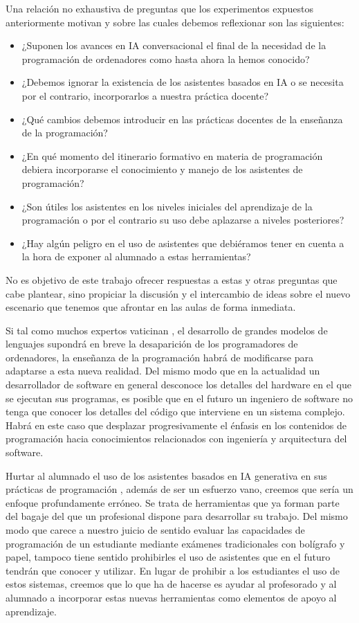 \documentclass[twocolumn,twoside,a4paper, 10pt]{article}
\begin{document}
Una relación no exhaustiva de preguntas que los experimentos expuestos anteriormente motivan y sobre las cuales 
debemos reflexionar son las siguientes:
\begin{itemize} 
\item ¿Suponen los avances en IA conversacional el final de la necesidad de la programación de ordenadores como hasta ahora
  la hemos conocido?
\item ¿Debemos ignorar la existencia de los asistentes basados en IA o se necesita por el contrario, incorporarlos a
    nuestra práctica docente?
\item ¿Qué cambios debemos introducir en las prácticas docentes de la enseñanza de la programación?
\item ¿En qué momento del itinerario formativo en materia de programación debiera incorporarse el conocimiento
  y manejo de los asistentes de programación?
\item ¿Son útiles los asistentes en los niveles iniciales del aprendizaje de la programación o por el
  contrario su uso debe aplazarse a niveles posteriores?
\item ¿Hay algún peligro en el uso de asistentes que debiéramos tener en cuenta a la hora de exponer al
  alumnado a estas herramientas?
\end {itemize} 

No es objetivo de este trabajo ofrecer respuestas a estas y otras preguntas que cabe plantear, sino propiciar
la discusión y el intercambio de ideas sobre el nuevo escenario que tenemos que afrontar en las aulas de forma
inmediata.

Si tal como muchos expertos vaticinan 
\cite{Welsh:2023:TEoP}, 
el desarrollo de grandes modelos de lenguajes supondrá en breve la desaparición de los programadores de
ordenadores, la enseñanza de la programación habrá de modificarse para adaptarse a esta nueva realidad. 
Del mismo modo que en la actualidad un desarrollador de software en general desconoce los detalles del
hardware en el que se ejecutan sus programas, es posible que en el futuro un ingeniero de software no
tenga que conocer los detalles del código que interviene en un sistema complejo.
Habrá en este caso que desplazar progresivamente el énfasis en los contenidos de programación hacia 
conocimientos relacionados con ingeniería y arquitectura del software.

Hurtar al alumnado el uso de los asistentes basados en IA generativa en sus prácticas de programación
\cite{Cassidy:2023:AUR}, 
además de ser un esfuerzo vano, creemos que sería un enfoque profundamente erróneo.
Se trata de herramientas que ya forman parte del bagaje del que un profesional dispone para desarrollar su trabajo.
Del mismo modo que carece a nuestro juicio de sentido evaluar las capacidades de programación de un estudiante
mediante exámenes tradicionales con bolígrafo y papel, tampoco tiene sentido prohibirles el uso de
asistentes que en el futuro tendrán que conocer y utilizar.
En lugar de prohibir a los estudiantes el uso de estos sistemas, creemos que lo que ha de hacerse es ayudar
al profesorado y al alumnado a incorporar estas nuevas herramientas como elementos de apoyo al aprendizaje.
\end{document}
